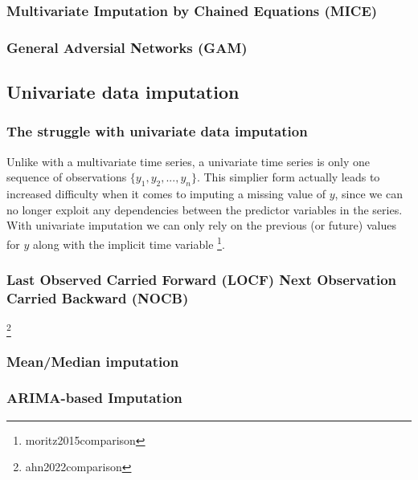 \documentclass[
]{report}
\begin{document}

\subsubsection{Multivariate Imputation by Chained Equations
(MICE)}\label{multivariate-imputation-by-chained-equations-mice}

\subsubsection{General Adversial Networks
(GAM)}\label{general-adversial-networks-gam}

\subsection{Univariate data
imputation}\label{univariate-data-imputation}

\subsubsection{The struggle with univariate data
imputation}\label{the-struggle-with-univariate-data-imputation}

Unlike with a multivariate time series, a univariate time series is only
one sequence of observations \(\{y_1, y_2, ..., y_n\}\). This simplier
form actually leads to increased difficulty when it comes to imputing a
missing value of \(y\), since we can no longer exploit any dependencies
between the predictor variables in the series. With univariate
imputation we can only rely on the previous (or future) values for \(y\)
along with the implicit time variable \footnote{moritz2015comparison}.

\subsubsection{Last Observed Carried Forward (LOCF) Next Observation
Carried Backward
(NOCB)}\label{last-observed-carried-forward-locf-next-observation-carried-backward-nocb}

\footnote{ahn2022comparison}

\subsubsection{Mean/Median imputation}\label{meanmedian-imputation}

\subsubsection{ARIMA-based Imputation}\label{arima-based-imputation}
\end{document}
